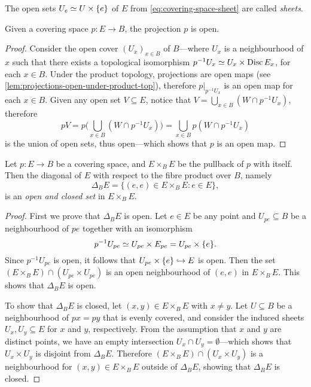 \begin{notation}[Sheets]
\label{not:coveing-space-sheet}
The open sets \(U_e \simeq U \times \{e\}\) of \(E\) from
\cref{eq:covering-space-sheet} are called \emph{sheets}.
\end{notation}

\begin{proposition}
\label{prop:covering-projection-is-open}
Given a covering space \(p: E \to B\), the projection \(p\) is open.
\end{proposition}

\begin{proof}
Consider the open cover \((U_x)_{x \in B}\) of \(B\)---where \(U_x\) is a
neighbourhood of \(x\) such that there exists a topological isomorphism
\(p^{-1} U_x \simeq U_x \times \operatorname{Disc} E_x\), for each \(x \in B\). Under the
product topology, projections are open maps (see
\cref{lem:projections-open-under-product-top}), therefore \(p|_{p^{-1} U_x}\) is
an open map for each \(x \in B\). Given any open set \(V \subseteq E\), notice
that \(V = \bigcup_{x \in B} (W \cap p^{-1} U_x)\), therefore
\[
p V = p\Big(\bigcup_{x \in B} (W \cap p^{-1} U_x)\Big)
= \bigcup_{x \in B} p(W \cap p^{-1} U_x)
\]
is the union of open sets, thus open---which shows that \(p\) is an open map.
\end{proof}

\begin{lemma}
\label{lem:fibre-wise-diag-open-and-closed}
Let \(p: E \to B\) be a covering space, and \(E \times_B E\) be the pullback of
\(p\) with itself. Then the diagonal of \(E\) with respect to the fibre product
over \(B\), namely
\[
\Delta_B E = \{(e, e) \in E \times_B E \colon e \in E\},
\]
is an \emph{open and closed set} in \(E \times_B E\).
\end{lemma}

\begin{proof}
First we prove that \(\Delta_B E\) is open. Let \(e \in E\) be any point and
\(U_{p e} \subseteq B\) be a neighbourhood of \(p e\) together with an
isomorphism
\[
p^{-1} U_{p e} \simeq U_{p e} \times E_{p e} = U_{p e} \times \{e\}.
\]
Since \(p^{-1} U_{p e}\) is open, it follows that
\(U_{p e} \times \{e\} \hookrightarrow E\) is open. Then the set
\((E \times_B E) \cap (U_{p e} \times U_{p e})\) is an open neighbourhood of
\((e, e)\) in \(E \times_B E\). This shows that \(\Delta_B E\) is open.

To show that \(\Delta_B E\) is closed, let \((x, y) \in E \times_B E\) with
\(x \neq y\). Let \(U \subseteq B\) be a neighbourhood of \(p x = p y\) that is
evenly covered, and consider the induced sheets \(U_x, U_y \subseteq E\) for
\(x\) and \(y\), respectively. From the assumption that \(x\) and \(y\) are
distinct points, we have an empty intersection
\(U_x \cap U_y = \emptyset\)---which shows that \(U_x \times U_y\) is disjoint
from \(\Delta_B E\). Therefore \((E \times_B E) \cap (U_x \times U_y)\) is a
neighbourhood for \((x, y) \in E \times_B E\) outside of \(\Delta_B E\), showing
that \(\Delta_B E\) is closed.
\end{proof}

